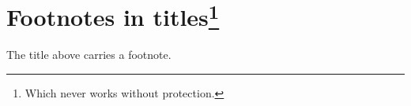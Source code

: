 \section{Footnotes in titles\footnote{Which never works without protection.}}

The title above carries a footnote.
